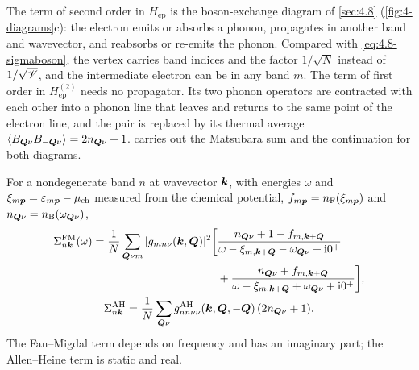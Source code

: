 The term of second order in $H_{\mathrm{ep}}$ is the boson-exchange diagram of \cref{sec:4.8} (\cref{fig:4-diagrams}c): the electron emits or absorbs a phonon, propagates in another band and wavevector, and reabsorbs or re-emits the phonon. Compared with \cref{eq:4.8-sigmaboson}, the vertex carries band indices and the factor $1/\sqrt N$ instead of $1/\sqrt {\mathscr{V}}$, and the intermediate electron can be in any band $m$. The term of first order in $H^{(2)}_{\mathrm{ep}}$ needs no propagator. Its two phonon operators are contracted with each other into a phonon line that leaves and returns to the same point of the electron line, and the pair is replaced by its thermal average $\langle B_{\bm{Q}\nu}B_{-\bm{Q}\nu}\rangle = 2n_{\bm{Q}\nu} + 1$.  carries out the Matsubara sum and the continuation for both diagrams.
\begin{keyresult}
For a nondegenerate band $n$ at wavevector $\bm{k}$, with energies $\omega$ and $\xi_{m\bm{p}} = \varepsilon_{m\bm{p}} - \mu_{\mathrm{ch}}$ measured from the chemical potential, $f_{m\bm{p}} = n_{\mathrm{F}}(\xi_{m\bm{p}})$ and $n_{\bm{Q}\nu} = n_{\mathrm{B}}(\omega_{\bm{Q}\nu})$,
\begin{gather}
  \begin{aligned}
  \Sigma^{\mathrm{FM}}_{n\bm{k}}(\omega) = \frac1N\sum_{\bm{Q}\nu m}|g_{mn\nu}(\bm{k},\bm{Q})|^2
  \biggl[&\frac{n_{\bm{Q}\nu} + 1 - f_{m,\bm{k}+\bm{Q}}}{\omega - \xi_{m,\bm{k}+\bm{Q}} - \omega_{\bm{Q}\nu} + \mathrm{i}0^+} \\
  &+ \frac{n_{\bm{Q}\nu} + f_{m,\bm{k}+\bm{Q}}}{\omega - \xi_{m,\bm{k}+\bm{Q}} + \omega_{\bm{Q}\nu} + \mathrm{i}0^+}\biggr] ,
  \end{aligned}
  \label{eq:6.3-FM}\\
  \Sigma^{\mathrm{AH}}_{n\bm{k}} = \frac1N\sum_{\bm{Q}\nu}g^{\mathrm{AH}}_{nn\nu\nu}(\bm{k},\bm{Q},-\bm{Q})\,(2n_{\bm{Q}\nu} + 1) .
  \label{eq:6.3-AH}
\end{gather}
The Fan--Migdal term depends on frequency and has an imaginary part; the Allen--Heine term is static and real.
\end{keyresult}
